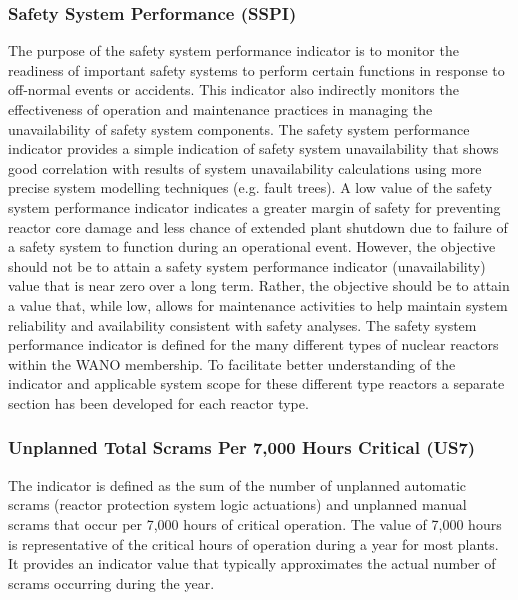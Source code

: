 \documentclass{article}
\begin{document}
\subsubsection*{Safety System Performance (SSPI)}

The purpose of the safety system performance indicator is to monitor the readiness of important safety systems to perform certain functions in response to off-normal events or accidents. This indicator also indirectly monitors the effectiveness of operation and maintenance practices in managing the unavailability of safety system components.
The safety system performance indicator provides a simple indication of safety system unavailability that shows good correlation with results of system unavailability calculations using more precise system modelling techniques (e.g. fault trees). A low value of the safety system performance indicator indicates a greater margin of safety for preventing reactor core damage and less chance of extended plant shutdown due to failure of a safety system to function during an operational event.
However, the objective should not be to attain a safety system performance indicator (unavailability) value that is near zero over a long term. Rather, the objective should be to attain a value that, while low, allows for maintenance activities to help maintain system reliability and availability consistent with safety analyses.
The safety system performance indicator is defined for the many different types of nuclear reactors within the WANO membership. To facilitate better understanding of the indicator and applicable system scope for these different type reactors a separate section has been developed for each reactor type.

\subsubsection*{Unplanned Total Scrams Per 7,000 Hours Critical (US7)}

The indicator is defined as the sum of the number of unplanned automatic scrams (reactor protection system logic actuations) and unplanned manual scrams that occur per 7,000 hours of critical operation.
The value of 7,000 hours is representative of the critical hours of operation during a year for most plants. It provides an indicator value that typically approximates the actual number of scrams occurring during the year.
\end{document}
